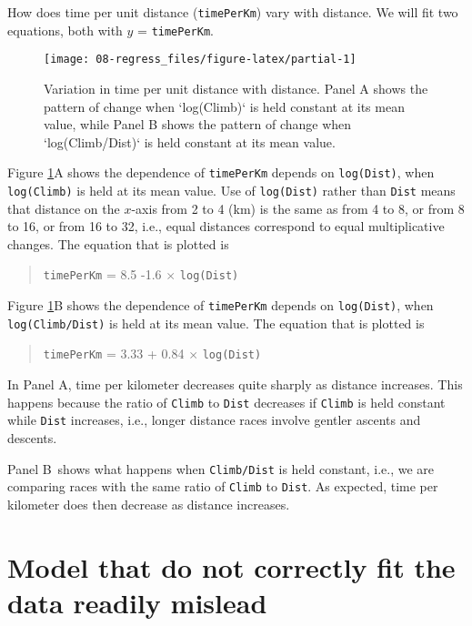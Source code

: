 \documentclass[
  10ptls,
  b5paper]{book}
\begin{document}
How does time per unit distance (\texttt{timePerKm}) vary with distance. We will fit two equations, both with \(y\) = \texttt{timePerKm}.

\begin{figure}[H]

{\centering \texttt{[image: 08-regress\_files/figure-latex/partial-1]} 

}

\caption{Variation in time per unit distance with distance.  Panel A
shows the pattern of change when `log(Climb)` is held constant at its 
mean value, while Panel B shows the pattern of change when 
`log(Climb/Dist)` is held constant at its mean value.}\label{fig:partial}
\end{figure}

Figure \ref{fig:partial}A shows the dependence of \texttt{timePerKm} depends on \texttt{log(Dist)}, when \texttt{log(Climb)} is held at its mean value. Use of \texttt{log(Dist)} rather than \texttt{Dist} means that distance on the \(x\)-axis from 2 to 4 (km) is the same as from 4 to 8, or from 8 to 16, or from 16 to 32, i.e., equal distances correspond to equal multiplicative changes. The equation that is plotted is

\begin{quote}
\texttt{timePerKm} = 8.5 -1.6 \(\times\) \texttt{log(Dist)}
\end{quote}

Figure \ref{fig:partial}B shows the dependence of \texttt{timePerKm} depends on \texttt{log(Dist)}, when \texttt{log(Climb/Dist)} is held at its mean value. The equation that is plotted is

\begin{quote}
\texttt{timePerKm} = 3.33 + 0.84 \(\times\) \texttt{log(Dist)}
\end{quote}

In Panel A, time per kilometer decreases quite sharply as distance increases. This happens because the ratio of \texttt{Climb} to \texttt{Dist} decreases if \texttt{Climb} is held constant while \texttt{Dist} increases, i.e., longer distance races involve gentler ascents and descents.

Panel B~shows what happens when \texttt{Climb/Dist} is held constant, i.e., we are comparing races with the same ratio of \texttt{Climb} to \texttt{Dist}. As expected, time per kilometer does then decrease as distance increases.

\section{Model that do not correctly fit the data readily mislead}\label{model-that-do-not-correctly-fit-the-data-readily-mislead}
\end{document}
